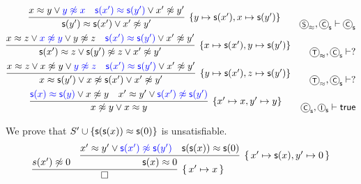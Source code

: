 \begin{example}
\begin{align*}
\infer[ \{ y\mapsto \msucc(x'), x\mapsto\msucc(y')\}]
{\msucc(y')\mEQ\msucc(x')\lor x'\mNE y'}
{x \mEQ y \lor {\colN y \mNE x} & {\colN \msucc(x') \mEQ \msucc(y')} \lor x'\mNE y'}
\tag*{\( \axiom{S}_\mEQ,\axiom{C}_\msucc\proves \axiom{C}_\msucc \)}
\\
\infer[ \{ x\mapsto\msucc(x'),y\mapsto\msucc(y')\}]
{\msucc(x')\mEQ z\lor \msucc(y')\mNE z \lor x'\mNE y'}
{x \mEQ z \lor {\colN x \mNE y} \lor {y\mNE z} & {\colN \msucc(x') \mEQ \msucc(y')} \lor x'\mNE y'}
\tag*{\( \axiom{T}_\mEQ,\axiom{C}_\msucc\proves ? \)}
\\
\infer[ \{ y\mapsto\msucc(x'),z\mapsto\msucc(y')\}]
{x\mEQ\msucc(y')\lor x\mNE\msucc(x')\lor x'\mNE y'}
{x \mEQ z \lor {x \mNE y} \lor {\colN y\mNE z} & {\colN \msucc(x') \mEQ \msucc(y')} \lor x'\mNE y'}
\tag*{\( \axiom{T}_\mEQ,\axiom{C}_\msucc\proves ? \)}
\\
\infer[ \{ x'\mapsto x, y'\mapsto y\}]
{x\mNE y\lor x\mEQ y}
{{\colN \msucc(x) \mEQ \msucc(y)} \lor x\mNE y & x' \mEQ y' \lor {\colN \msucc(x') \mNE \msucc(y')}}
\tag*{\( \axiom{C}_\msucc,\axiom{I}_\msucc\proves\true \)}
\\
	\end{align*}
\end{example}

\begin{example} 
	We prove that \( S' \cup \{ \mathsf{s}(\mathsf{s}(x))\approx\mathsf{s}(0) \} \) is unsatisfiable.
	\begin{gather*}
	\infer[ \{ \, x'\mapsto x \, \}]
	{\square}
	{s(x')\mNE 0 &
		\infer[
		 \{ \, x'\mapsto \msucc(x), y'\mapsto 0 \, \}
		]{
			\msucc(x)\mEQ 0
		}{
			x' \mEQ y' \lor {\colN \msucc(x') \mNE \msucc(y')}
			& {\msucc(\msucc(x))\mEQ\msucc(0)}
		}
	}
	\end{gather*}
\end{example}

